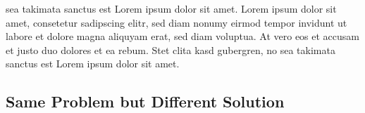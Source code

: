 \documentclass[11pt,twoside,a4paper,titlepage]{article}
\begin{document}



sea takimata sanctus est Lorem ipsum dolor sit amet. Lorem ipsum dolor sit amet, consetetur sadipscing elitr, sed diam nonumy eirmod tempor invidunt ut labore et dolore magna aliquyam erat, sed diam voluptua. At vero eos et accusam et justo duo dolores et ea rebum. Stet clita kasd gubergren, no sea takimata sanctus est Lorem ipsum dolor sit amet. 


\subsection{Same Problem but Different Solution}
\end{document}
